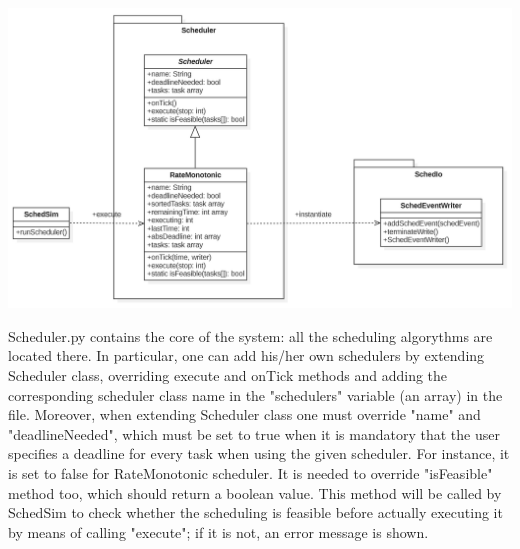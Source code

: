 \begin{center}
\includegraphics[width=1\textwidth]{SchedulerClass.png}
\end{center}
Scheduler.py contains the core of the system: all the scheduling algorythms are located there. In particular, one can add his/her own schedulers by extending Scheduler class, overriding execute and onTick methods and adding the corresponding scheduler class name in the "schedulers" variable (an array) in the file. Moreover, when extending Scheduler class one must override "name" and "deadlineNeeded", which must be set to true when it is mandatory that the user specifies a deadline for every task when using the given scheduler. For instance, it is set to false for RateMonotonic scheduler. It is needed to override "isFeasible" method too, which should return a boolean value. This method will be called by SchedSim to check whether the scheduling is feasible before actually executing it by means of calling "execute"; if it is not, an error message is shown.

